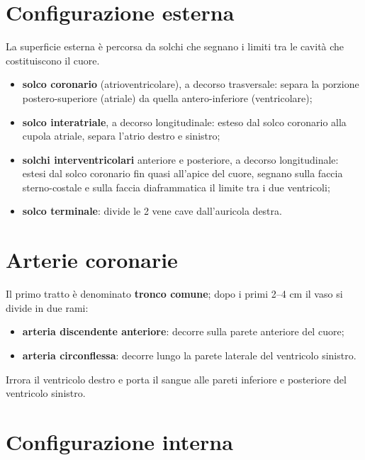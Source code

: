 \section{Configurazione esterna}

La superficie esterna è percorsa da solchi che segnano i limiti tra le cavità che costituiscono
il cuore.
\begin{itemize}
  \item \textbf{solco coronario} (atrioventricolare), a decorso trasversale: separa la porzione
    postero-superiore (atriale) da quella antero-inferiore (ventricolare);
  \item \textbf{solco interatriale}, a decorso longitudinale: esteso dal solco coronario alla
    cupola atriale, separa l'atrio destro e sinistro;
  \item \textbf{solchi interventricolari} anteriore e posteriore, a decorso longitudinale: estesi
    dal solco coronario fin quasi all'apice del cuore, segnano sulla faccia sterno-costale e sulla
    faccia diaframmatica il limite tra i due ventricoli;
  \item \textbf{solco terminale}: divide le 2 vene cave dall'auricola destra.
\end{itemize}

\section{Arterie coronarie}

Il primo tratto è denominato \textbf{tronco comune}; dopo i primi 2--4 cm il vaso si divide in
due rami:
\begin{itemize}
  \item \textbf{arteria discendente anteriore}: decorre sulla parete anteriore del cuore;
  \item \textbf{arteria circonflessa}: decorre lungo la parete laterale del ventricolo sinistro.
\end{itemize}

Irrora il ventricolo destro e porta il sangue alle pareti inferiore e posteriore del ventricolo
sinistro.

\section{Configurazione interna}

